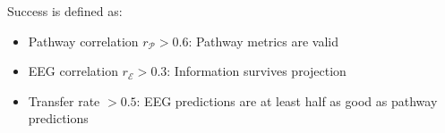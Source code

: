 Success is defined as:
\begin{itemize}
    \item Pathway correlation $r_{\mathcal{P}} > 0.6$: Pathway metrics are valid
    \item EEG correlation $r_{\mathcal{E}} > 0.3$: Information survives projection
    \item Transfer rate $> 0.5$: EEG predictions are at least half as good as pathway predictions
\end{itemize}
